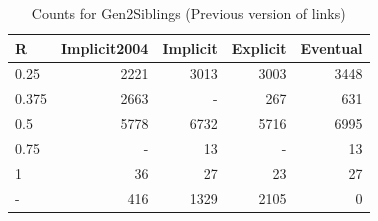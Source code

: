 \documentclass[a4paper]{article}\usepackage[]{graphicx}\usepackage[]{color}
\begin{document}
\begin{table}[ht]
\centering
\begingroup\large
\begin{tabular}{lrrrr}
  \hline
R & Implicit2004 & Implicit & Explicit & Eventual \\ 
  \hline
0.25 & 2221 & 3013 & 3003 & 3448 \\ 
  0.375 & 2663 & - & 267 & 631 \\ 
  0.5 & 5778 & 6732 & 5716 & 6995 \\ 
  0.75 & - &  13 & - &  13 \\ 
  1 &  36 &  27 &  23 &  27 \\ 
  - & 416 & 1329 & 2105 &   0 \\ 
   \hline
\end{tabular}
\endgroup
\caption{Counts for Gen2Siblings (Previous version of links)} 
\end{table}
\end{document}
